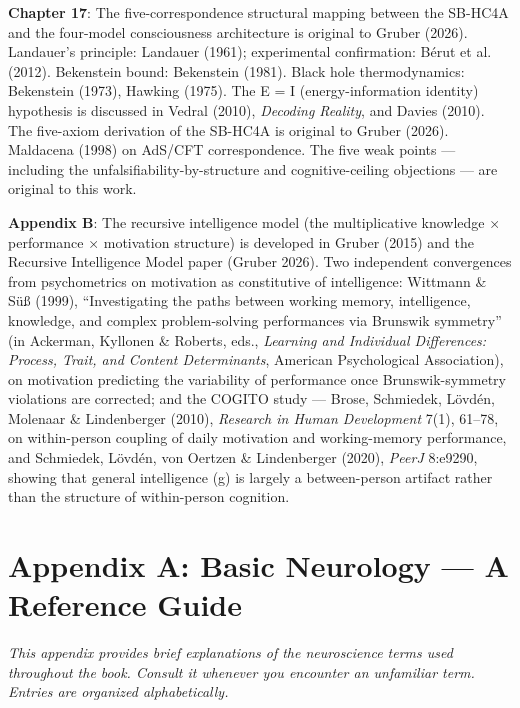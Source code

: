 \documentclass[11pt, twoside, openright]{book}
\begin{document}
\textbf{Chapter 17}: The five-correspondence structural mapping between the SB-HC4A and the four-model consciousness architecture is original to Gruber (2026). Landauer's principle: Landauer (1961); experimental confirmation: Bérut et al. (2012). Bekenstein bound: Bekenstein (1981). Black hole thermodynamics: Bekenstein (1973), Hawking (1975). The E = I (energy-information identity) hypothesis is discussed in Vedral (2010), \textit{Decoding Reality}, and Davies (2010). The five-axiom derivation of the SB-HC4A is original to Gruber (2026). Maldacena (1998) on AdS/CFT correspondence. The five weak points --- including the unfalsifiability-by-structure and cognitive-ceiling objections --- are original to this work.

\textbf{Appendix B}: The recursive intelligence model (the multiplicative knowledge × performance × motivation structure) is developed in Gruber (2015) and the Recursive Intelligence Model paper (Gruber 2026). Two independent convergences from psychometrics on motivation as constitutive of intelligence: Wittmann \& Süß (1999), ``Investigating the paths between working memory, intelligence, knowledge, and complex problem-solving performances via Brunswik symmetry'' (in Ackerman, Kyllonen \& Roberts, eds., \textit{Learning and Individual Differences: Process, Trait, and Content Determinants}, American Psychological Association), on motivation predicting the variability of performance once Brunswik-symmetry violations are corrected; and the COGITO study --- Brose, Schmiedek, Lövdén, Molenaar \& Lindenberger (2010), \textit{Research in Human Development} 7(1), 61--78, on within-person coupling of daily motivation and working-memory performance, and Schmiedek, Lövdén, von Oertzen \& Lindenberger (2020), \textit{PeerJ} 8:e9290, showing that general intelligence (g) is largely a between-person artifact rather than the structure of within-person cognition.


\chapter*{Appendix A: Basic Neurology --- A Reference Guide}

\textit{This appendix provides brief explanations of the neuroscience terms used throughout the book. Consult it whenever you encounter an unfamiliar term. Entries are organized alphabetically.}
\end{document}
